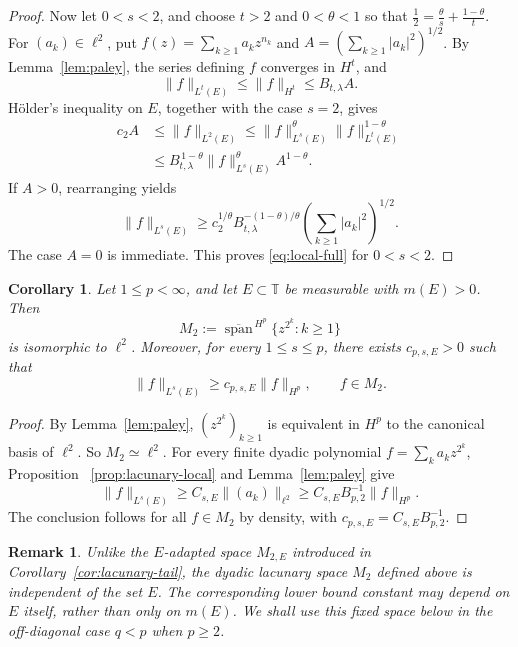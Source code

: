 \documentclass[10pt,a4paper]{amsart}
\newtheorem{corollary}[theorem]{Corollary}
\newtheorem{remark}[theorem]{Remark}
\newcommand{\T}{\mathbb{T}}
\begin{document}
\begin{proof}
Now let \(0<s<2\), and choose \(t>2\) and \(0<\theta<1\) so that
\(\frac{1}{2}=\frac{\theta}{s}+\frac{1-\theta}{t}\). For \((a_k)\in\ell^2\), put
\(f(z)=\sum_{k\ge1}a_kz^{n_k}\) and
\(A=(\sum_{k\ge1}|a_k|^2)^{1/2}\). By
Lemma~\ref{lem:paley}, the series defining \(f\) converges in
\(H^t\), and
\[
        \|f\|_{L^t(E)}
        \le
        \|f\|_{H^t}
        \le
        B_{t,\lambda}A.
\]
H\"older's inequality on \(E\), together with the case \(s=2\), gives
\[
\begin{aligned}
        c_2A
        &\le
        \|f\|_{L^2(E)} 
        \le
        \|f\|_{L^s(E)}^\theta
        \|f\|_{L^t(E)}^{1-\theta} \\
        &\le
        B_{t,\lambda}^{\,1-\theta}
        \|f\|_{L^s(E)}^\theta A^{1-\theta}.
\end{aligned}
\]
If \(A>0\), rearranging yields
\[
        \|f\|_{L^s(E)}
        \ge
        c_2^{1/\theta}
        B_{t,\lambda}^{-(1-\theta)/\theta}
        \left(\sum_{k\ge1}|a_k|^2\right)^{1/2}.
\]
The case \(A=0\) is immediate. This proves
\eqref{eq:local-full} for \(0<s<2\). 
\end{proof}


\begin{corollary}
\label{cor:lacunary-set}
Let \(1\le p<\infty\), and let \(E\subset\T\) be measurable with
\(m(E)>0\). Then
\[
        M_2
        :=
        \overline{\operatorname{span}}^{\,H^p}
        \{z^{2^k}:k\ge1\}
\]
is isomorphic to \(\ell^2\). Moreover, for every \(1\le s\le p\),
there exists \(c_{p,s,E}>0\) such that
\[
        \|f\|_{L^s(E)}
        \ge
        c_{p,s,E}\|f\|_{H^p},
        \qquad
        f\in M_2.
\]
\end{corollary}

\begin{proof}
By Lemma~\ref{lem:paley},
\((z^{2^k})_{k\ge1}\) is equivalent in \(H^p\) to the canonical basis
of \(\ell^2\). So \(M_2\simeq\ell^2\).  For every finite dyadic
polynomial \(f=\sum_k a_kz^{2^k}\), Proposition~
\ref{prop:lacunary-local} and
Lemma~\ref{lem:paley} give
\[
        \|f\|_{L^s(E)}
        \ge
        C_{s,E}\|(a_k)\|_{\ell^2}
        \ge
        C_{s,E}B_{p,2}^{-1}\|f\|_{H^p}.
\]
The conclusion follows for all \(f\in M_2\) by density, with
\(c_{p,s,E}=C_{s,E}B_{p,2}^{-1}\).
\end{proof}


\begin{remark}
Unlike the \(E\)-adapted space \(M_{2,E}\) introduced in
Corollary~\ref{cor:lacunary-tail}, the dyadic lacunary
space \(M_2\) defined above is independent of the set \(E\). The
corresponding lower bound constant may depend on \(E\) itself, rather
than only on \(m(E)\). We shall use this fixed space below in the
off-diagonal case \(q<p\) when \(p\ge2\).
\end{remark}
\end{document}
